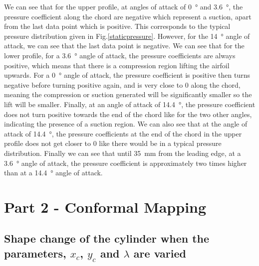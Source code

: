 \documentclass[11pt]{article}
\begin{document}
We can see that for the upper profile, at angles of attack of \SI{0}{\degree} and \SI{3.6}{\degree}, the pressure coefficient along the chord are negative which represent a suction, apart from the last data point which is positive. This corresponds to the typical pressure distribution given in Fig.\ref{staticpressure}. However, for the \SI{14}{\degree} angle of attack, we can see that the last data point is negative. We can see that for the lower profile, for a \SI{3.6}{\degree} angle of attack, the pressure coefficients are always positive, which means that there is a compression region lifting the airfoil upwards. For a \SI{0}{\degree} angle of attack, the pressure coefficient is positive then turns negative before turning positive again, and is very close to 0 along the chord, meaning the compression or suction generated will be significantly smaller so the lift will be smaller. Finally, at an angle of attack of \SI{14.4}{\degree}, the pressure coefficient does not turn positive towards the end of the chord like for the two other angles, indicating the presence of a suction region. We can also see that at the angle of attack of \SI{14.4}{\degree}, the pressure coefficients at the end of the chord in the upper profile does not get closer to 0 like there would be in a typical pressure distribution. Finally we can see that until \SI{35}{\milli\meter} from the leading edge, at a \SI{3.6}{\degree} angle of attack, the pressure coefficient is approximately two times higher than at a \SI{14.4}{\degree} angle of attack.
\section*{Part 2 - Conformal Mapping}
\subsection*{Shape change of the cylinder when the parameters, $x_c$, $y_c$ and $\lambda$ are varied}
\end{document}
